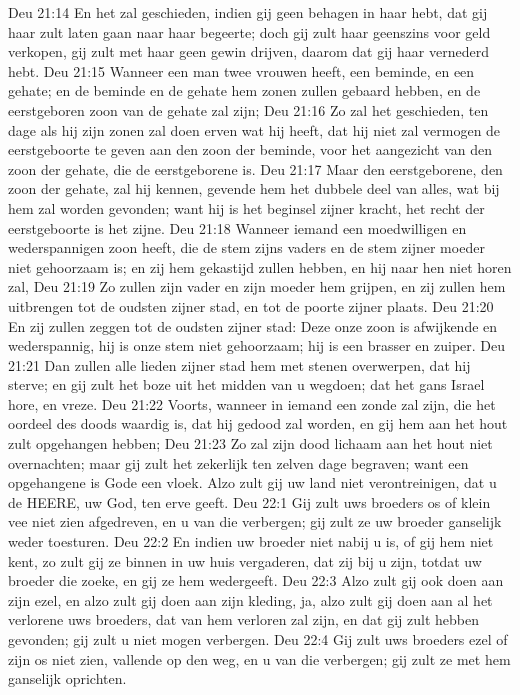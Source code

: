 Deu 21:14  En het zal geschieden, indien gij geen behagen in haar hebt, dat gij haar zult laten gaan naar haar begeerte; doch gij zult haar geenszins voor geld verkopen, gij zult met haar geen gewin drijven, daarom dat gij haar vernederd hebt.
Deu 21:15  Wanneer een man twee vrouwen heeft, een beminde, en een gehate; en de beminde en de gehate hem zonen zullen gebaard hebben, en de eerstgeboren zoon van de gehate zal zijn;
Deu 21:16  Zo zal het geschieden, ten dage als hij zijn zonen zal doen erven wat hij heeft, dat hij niet zal vermogen de eerstgeboorte te geven aan den zoon der beminde, voor het aangezicht van den zoon der gehate, die de eerstgeborene is.
Deu 21:17  Maar den eerstgeborene, den zoon der gehate, zal hij kennen, gevende hem het dubbele deel van alles, wat bij hem zal worden gevonden; want hij is het beginsel zijner kracht, het recht der eerstgeboorte is het zijne.
Deu 21:18  Wanneer iemand een moedwilligen en wederspannigen zoon heeft, die de stem zijns vaders en de stem zijner moeder niet gehoorzaam is; en zij hem gekastijd zullen hebben, en hij naar hen niet horen zal,
Deu 21:19  Zo zullen zijn vader en zijn moeder hem grijpen, en zij zullen hem uitbrengen tot de oudsten zijner stad, en tot de poorte zijner plaats.
Deu 21:20  En zij zullen zeggen tot de oudsten zijner stad: Deze onze zoon is afwijkende en wederspannig, hij is onze stem niet gehoorzaam; hij is een brasser en zuiper.
Deu 21:21  Dan zullen alle lieden zijner stad hem met stenen overwerpen, dat hij sterve; en gij zult het boze uit het midden van u wegdoen; dat het gans Israel hore, en vreze.
Deu 21:22  Voorts, wanneer in iemand een zonde zal zijn, die het oordeel des doods waardig is, dat hij gedood zal worden, en gij hem aan het hout zult opgehangen hebben;
Deu 21:23  Zo zal zijn dood lichaam aan het hout niet overnachten; maar gij zult het zekerlijk ten zelven dage begraven; want een opgehangene is Gode een vloek. Alzo zult gij uw land niet verontreinigen, dat u de HEERE, uw God, ten erve geeft.
Deu 22:1  Gij zult uws broeders os of klein vee niet zien afgedreven, en u van die verbergen; gij zult ze uw broeder ganselijk weder toesturen.
Deu 22:2  En indien uw broeder niet nabij u is, of gij hem niet kent, zo zult gij ze binnen in uw huis vergaderen, dat zij bij u zijn, totdat uw broeder die zoeke, en gij ze hem wedergeeft.
Deu 22:3  Alzo zult gij ook doen aan zijn ezel, en alzo zult gij doen aan zijn kleding, ja, alzo zult gij doen aan al het verlorene uws broeders, dat van hem verloren zal zijn, en dat gij zult hebben gevonden; gij zult u niet mogen verbergen.
Deu 22:4  Gij zult uws broeders ezel of zijn os niet zien, vallende op den weg, en u van die verbergen; gij zult ze met hem ganselijk oprichten.
